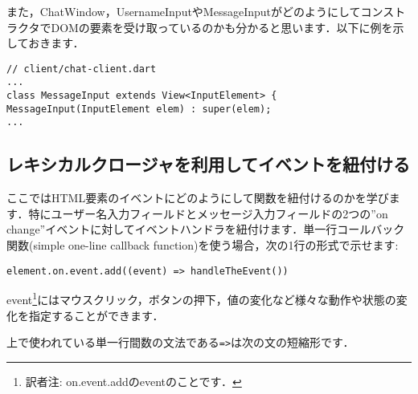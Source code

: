 
また，ChatWindow，UsernameInputやMessageInputがどのようにしてコンストラクタでDOMの要素を受け取っているのかも分かると思います．以下に例を示しておきます．

\begin{verbatim}
// client/chat-client.dart
...
class MessageInput extends View<InputElement> {
MessageInput(InputElement elem) : super(elem);
...
\end{verbatim}

\subsection{レキシカルクロージャを利用してイベントを紐付ける}

ここではHTML要素のイベントにどのようにして関数を紐付けるのかを学びます．特にユーザー名入力フィールドとメッセージ入力フィールドの2つの''on change''イベントに対してイベントハンドラを紐付けます．単一行コールバック関数(simple one-line callback function)を使う場合，次の1行の形式で示せます:

\begin{verbatim}
element.on.event.add((event) => handleTheEvent())
\end{verbatim}

event\footnote{訳者注: on.event.addのeventのことです．}にはマウスクリック，ボタンの押下，値の変化など様々な動作や状態の変化を指定することができます．


上で使われている単一行間数の文法である\verb|=>|は次の文の短縮形です．

